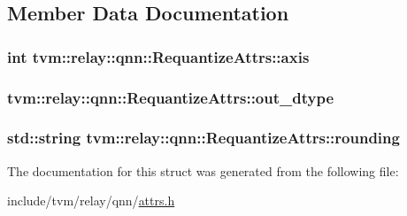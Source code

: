 \subsection{Member Data Documentation}
\subsubsection[{\texorpdfstring{axis}{axis}}]{\setlength{\rightskip}{0pt plus 5cm}int tvm\+::relay\+::qnn\+::\+Requantize\+Attrs\+::axis}\hypertarget{structtvm_1_1relay_1_1qnn_1_1RequantizeAttrs_a0dbe4aa881fcb9dfdfe43508df598a01}{}\label{structtvm_1_1relay_1_1qnn_1_1RequantizeAttrs_a0dbe4aa881fcb9dfdfe43508df598a01}
\subsubsection[{\texorpdfstring{out\+\_\+dtype}{out_dtype}}]{ tvm\+::relay\+::qnn\+::\+Requantize\+Attrs\+::out\+\_\+dtype}\hypertarget{structtvm_1_1relay_1_1qnn_1_1RequantizeAttrs_a1440c1a273c779470bc5aea480da930b}{}\label{structtvm_1_1relay_1_1qnn_1_1RequantizeAttrs_a1440c1a273c779470bc5aea480da930b}
\subsubsection[{\texorpdfstring{rounding}{rounding}}]{\setlength{\rightskip}{0pt plus 5cm}std\+::string tvm\+::relay\+::qnn\+::\+Requantize\+Attrs\+::rounding}\hypertarget{structtvm_1_1relay_1_1qnn_1_1RequantizeAttrs_ae786b4706ed872d99ad26d6c42467f87}{}\label{structtvm_1_1relay_1_1qnn_1_1RequantizeAttrs_ae786b4706ed872d99ad26d6c42467f87}


The documentation for this struct was generated from the following file\+:\begin{DoxyCompactItemize}
\item 
include/tvm/relay/qnn/\hyperlink{relay_2qnn_2attrs_8h}{attrs.\+h}\end{DoxyCompactItemize}

